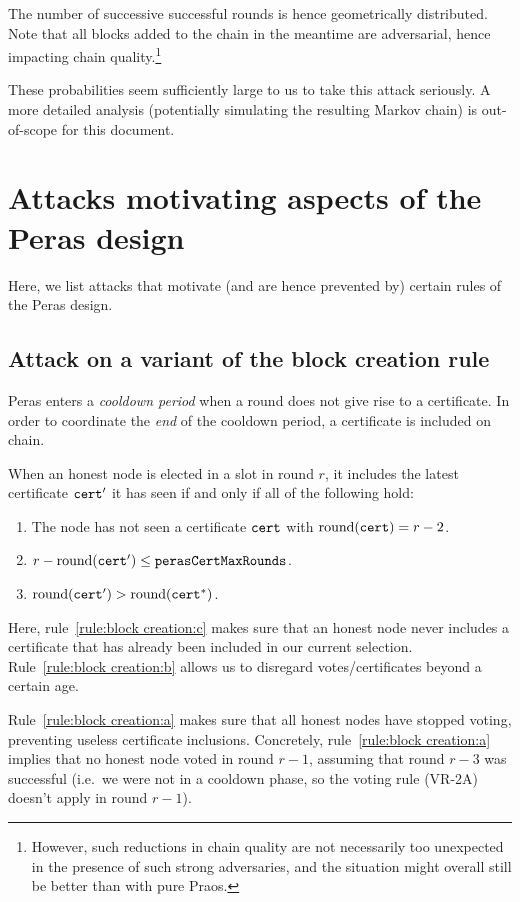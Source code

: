 \begin{enumerate}
  The number of successive successful rounds is hence geometrically distributed.
  Note that all blocks added to the chain in the meantime are adversarial, hence impacting chain quality.\footnote{However, such reductions in chain quality are not necessarily too unexpected in the presence of such strong adversaries, and the situation might overall still be better than with pure Praos.}
\end{enumerate}

These probabilities seem sufficiently large to us to take this attack seriously.
A more detailed analysis (potentially simulating the resulting Markov chain) is out-of-scope for this document.

\section{Attacks motivating aspects of the Peras design}

Here, we list attacks that motivate (and are hence prevented by) certain rules of the Peras design.

\subsection{Attack on a variant of the block creation rule}\label{sec:attack block creation rule}

Peras enters a \emph{cooldown period} when a round does not give rise to a certificate.
In order to coordinate the \emph{end} of the cooldown period, a certificate is included on chain.

When an honest node is elected in a slot in round $r$, it includes the latest certificate $\mathtt{cert}'$ it has seen if and only if all of the following hold:
\begin{enumerate}
\item\label{rule:block creation:a} The node has not seen a certificate $\mathtt{cert}$ with $\operatorname{round}(\mathtt{cert})=r-2$.
\item\label{rule:block creation:b} $r-\operatorname{round}(\mathtt{cert}') \le \mathtt{perasCertMaxRounds}$.
\item\label{rule:block creation:c} $\operatorname{round}(\mathtt{cert}') > \operatorname{round}(\mathtt{cert}^*)$.
\end{enumerate}
Here, rule~\ref{rule:block creation:c} makes sure that an honest node never includes a certificate that has already been included in our current selection.
Rule~\ref{rule:block creation:b} allows us to disregard votes/certificates beyond a certain age.

Rule~\ref{rule:block creation:a} makes sure that all honest nodes have stopped voting, preventing useless certificate inclusions.
Concretely, rule~\ref{rule:block creation:a} implies that no honest node voted in round $r-1$, assuming that round $r-3$ was successful (i.e.\ we were not in a cooldown phase, so the voting rule (VR-2A) doesn't apply in round $r-1$).

